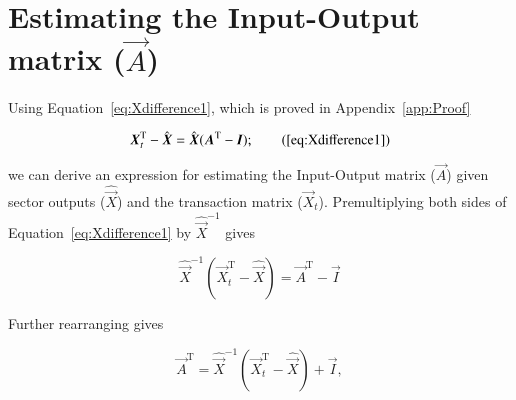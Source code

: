 %
%
%

\chapter{Estimating the Input-Output matrix ($\vec{A}$)}
\label{chap:Estimating_A} 


Using Equation~\ref{eq:Xdifference1}, which is proved in Appendix~\ref{app:Proof}

\begin{equation}
	\vec{X}_{t}^\mathrm{T} 
	- \hat{\vec{X}} 
	= \hat{\vec{X}}(\vec{A}^\mathrm{T} - \vec{I});
	\tag{\ref{eq:Xdifference1}}
\end{equation}

\noindent{}we can derive an expression for estimating the Input-Output matrix ($\vec{A}$)
given sector outputs ($\hat{\vec{X}}$) and the transaction matrix ($\vec{X}_{t}$).
Premultiplying both sides of Equation~\ref{eq:Xdifference1} by $\hat{\vec{X}}^{-1}$ gives

\begin{equation} \label{eq:Xdifference1Proof-5}
	\hat{\vec{X}}^{-1}
	\left( 
		\vec{X}_{t}^\mathrm{T} 
		- \hat{\vec{X}} 
	\right)
	= \vec{A}^\mathrm{T} - \vec{I}
\end{equation}

\noindent{}Further rearranging gives

\begin{equation}\label{eq:Xdifference1Proof-6}
	\vec{A}^\mathrm{T} 
	= \hat{\vec{X}}^{-1}
	\left( 
		\vec{X}_{t}^\mathrm{T} 
		- \hat{\vec{X}} 
	\right)
	+ \vec{I},
\end{equation}

